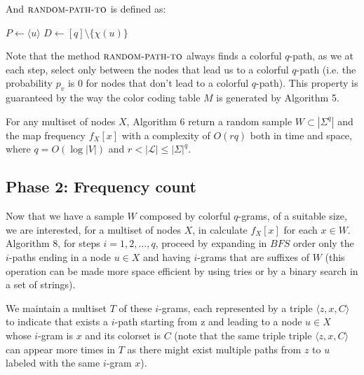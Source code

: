 And $\textsc{random-path-to}$ is defined as:

\begin{algorithm}[h]
	\small
	\DontPrintSemicolon
	$P\gets \langle u \rangle$\;
	$D\gets [q] \setminus \{\chi(u)\}$\;
	\caption{$\textsc{random-path-to}$}
	\label{alg:random-path-to}
\end{algorithm}

Note that the method $\textsc{random-path-to}$ always finds a colorful $q$-path, as we at each step, select only between the nodes that lead us to a colorful $q$-path (i.e. the probability $p_{v}$ is $0$ for nodes that don't lead to a colorful $q$-path). This property is guaranteed by the way the color coding table $M$ is generated by Algorithm 5.

\begin{lemma}
	For any multiset of nodes $X$, 
	Algorithm 6 return a random sample $W \subset |\Sigma^{q}|$ and the map frequency $f_{X}[x]$
	with a complexity of $O(rq)$ both in time and space, 
	where $q = O(\log |V|)$ and $r < |\mathcal{L}| \leq |\Sigma|^{q}$.
\end{lemma}

\clearpage
\subsection*{Phase 2: Frequency count}

Now that we have a sample $W$ composed by colorful $q$-grams, of a suitable size, we are interested, for a multiset of nodes $X$, in calculate $f_{X}[x]$ for each $x \in W$. Algorithm 8, for steps $i = 1, 2, \ldots, q$, proceed by expanding in $BFS$ order only the $i$-paths ending in a node $u \in X$ and having $i$-grams that are suffixes of $W$ (this operation can be made more space efficient by using tries or by a binary search in a set of strings).\medskip

We maintain a multiset $T$ of these $i$-grams, each represented by a triple $\langle z, x, C \rangle$ to indicate that exists a $i$-path starting from z and leading to a node $u \in X$ whose $i$-gram is $x$ and its colorset is $C$ (note that the same triple triple $\langle z, x, C \rangle$ can appear more times in $T$ as there might exist multiple paths from $z$ to $u$ labeled with the same $i$-gram $x$).\medskip

